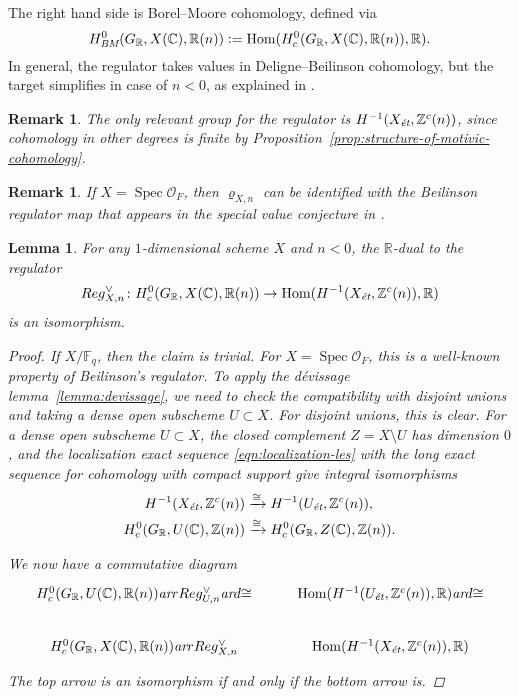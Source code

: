 \documentclass[draft]{article}
\DeclareMathOperator{\Hom}{Hom}
\DeclareMathOperator{\Spec}{Spec}
\newcommand{\CC}{\mathbb{C}}
\newcommand{\FF}{\mathbb{F}}
\newcommand{\RR}{\mathbb{R}}
\newcommand{\ZZ}{\mathbb{Z}}
\newcommand{\ar}{\text{\it ar}}
\newcommand{\BM}{\text{\it BM}}
\newcommand{\et}{\text{\it \'{e}t}}
\newcommand{\dfn}{\mathrel{\mathop:}=}
\theoremstyle{myplain}
\newtheorem{lemma}[theorem]{Lemma}
\theoremstyle{mydefinition}
\newtheorem{remark}[theorem]{Remark}
\numberwithin{equation}{section}
\begin{document}
The right hand side is Borel--Moore cohomology, defined via
\[ H^0_\BM (G_\RR, X(\CC), \RR(n)) \dfn
  \Hom (H^0_c (G_\RR, X(\CC), \RR(n)), \RR). \]
In general, the regulator takes values in Deligne--Beilinson cohomology, but the
target simplifies in case of $n < 0$, as explained in
\cite[\S 2]{Beshenov-Weil-etale-2}.

\begin{remark}
  The only relevant group for the regulator is $H^{-1} (X_\et, \ZZ^c (n))$,
  since cohomology in other degrees is finite by
  Proposition~\ref{prop:structure-of-motivic-cohomology}.
\end{remark}

\begin{remark}
  If $X = \Spec \mathcal{O}_F$, then $\varrho_{X,n}$ can be identified with the
  Beilinson regulator map that appears in the special value conjecture in
  \cite[\S 5.8.3]{Flach-Morin-2018}.
\end{remark}

\begin{lemma}
  \label{lemma:regulator-isomorphism}
  For any $1$-dimensional scheme $X$ and $n < 0$, the $\RR$-dual to the
  regulator
  \[ Reg_{X,n}^\vee\colon H^0_c (G_\RR, X(\CC), \RR(n)) \to
    \Hom (H^{-1} (X_\et, \ZZ^c (n)), \RR) \]
  is an isomorphism.

  \begin{proof}
    If $X/\FF_q$, then the claim is trivial. For $X = \Spec \mathcal{O}_F$, this
    is a well-known property of Beilinson's regulator. To apply the
    d\'{e}vissage lemma~\ref{lemma:devissage}, we need to check the
    compatibility with disjoint unions and taking a dense open subscheme
    $U \subset X$. For disjoint unions, this is clear. For a dense open
    subscheme $U \subset X$, the closed complement $Z = X\setminus U$ has
    dimension $0$, and the localization exact sequence
    \eqref{eqn:localization-les} with the long exact sequence for cohomology
    with compact support give integral isomorphisms
    \begin{align*}
      H^{-1} (X_\et, \ZZ^c (n)) & \xrightarrow{\cong} H^{-1} (U_\et, \ZZ^c (n)), \\
      H^0_c (G_\RR, U(\CC), \ZZ(n)) & \xrightarrow{\cong} H^0_c (G_\RR, Z(\CC), \ZZ(n)).
    \end{align*}

    We now have a commutative diagram
    \[ \begin{tikzcd}
        H^0_c (G_\RR, U(\CC), \RR(n)) \ar{r}{Reg_{U,n}^\vee} \ar{d}{\cong} &
        \Hom (H^{-1} (U_\et, \ZZ^c (n)), \RR) \ar{d}{\cong} \\
        H^0_c (G_\RR, X(\CC), \RR(n)) \ar{r}{Reg_{X,n}^\vee} &
        \Hom (H^{-1} (X_\et, \ZZ^c (n)), \RR)
      \end{tikzcd} \]
    The top arrow is an isomorphism if and only if the bottom arrow is.
  \end{proof}
\end{lemma}
\end{document}
